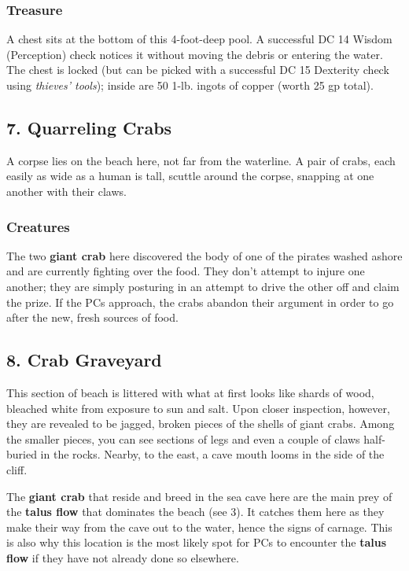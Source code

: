 \documentclass[10pt,a4paper,twoside,bg=print,twocolumn,openany,nodeprecatedcode]{dndbook}
\begin{document}
\subsubsection{Treasure}
A chest sits at the bottom of this 4-foot-deep pool. A successful DC 14 Wisdom (Perception) check notices it without moving the debris or entering the water. The chest is locked (but can be picked with a successful DC 15 Dexterity check using \textit{thieves' tools}); inside are 50 1-lb. ingots of copper (worth 25 gp total).

\subsection{7. Quarreling Crabs}
\begin{DndReadAloud}{}
A corpse lies on the beach here, not far from the waterline. A pair of crabs, each easily as wide as a human is tall, scuttle around the corpse, snapping at one another with their claws.

\end{DndReadAloud}

\subsubsection{Creatures}
The two \textbf{giant crab} here discovered the body of one of the pirates washed ashore and are currently fighting over the food. They don't attempt to injure one another; they are simply posturing in an attempt to drive the other off and claim the prize. If the PCs approach, the crabs abandon their argument in order to go after the new, fresh sources of food.

\subsection{8. Crab Graveyard}
\begin{DndReadAloud}{}
This section of beach is littered with what at first looks like shards of wood, bleached white from exposure to sun and salt. Upon closer inspection, however, they are revealed to be jagged, broken pieces of the shells of giant crabs. Among the smaller pieces, you can see sections of legs and even a couple of claws half-buried in the rocks. Nearby, to the east, a cave mouth looms in the side of the cliff.

\end{DndReadAloud}

The \textbf{giant crab} that reside and breed in the sea cave here are the main prey of the \textbf{talus flow} that dominates the beach (see 3). It catches them here as they make their way from the cave out to the water, hence the signs of carnage. This is also why this location is the most likely spot for PCs to encounter the \textbf{talus flow} if they have not already done so elsewhere.
\end{document}
